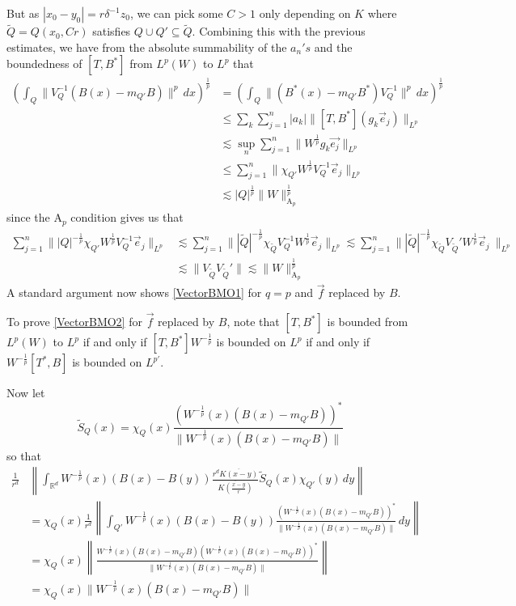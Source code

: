 \documentclass[12pt,reqno ]{amsart}
\numberwithin{equation}{section}
\theoremstyle{definition}
\newcommand{\Rd}{\ensuremath{\mathbb{R}^d}}
\newcommand{\V}[1]{\ensuremath{\vec{#1}}}
\newcommand{\inrd}{\ensuremath{\int_{\Rd}}}
\newcommand{\W}[1]{\ensuremath{\widetilde{#1}}}
\begin{document}
But as $|x_0 - y_0 | = r \delta^{-1} z_0$, we can pick some $C > 1$ only depending on $K$ where  $\tilde{Q} = Q(x_0, C r) $ satisfies $Q \cup Q' \subseteq \tilde{Q}$.  Combining this with the previous estimates, we have from the absolute summability of the $a_n's $ and the boundedness of $[T, B^*]$ from $L^p(W)$ to $L^p$ that \begin{align*} \left(\int_{Q} \|  V_Q ^{-1} (B(x) - m_{Q'} B ) \| ^p \, dx \right) ^{\frac{1}{p}} & = \left(\int_{Q} \|   (B^*(x) - m_{Q'} B^* ) V_Q ^{-1} \| ^p \, dx \right) ^{\frac{1}{p}} \\ & \leq \sum_k \sum_{j = 1}^n |a_k| \|  [T, B^*] (g_k \vec{e}_j)  \|_{L^p}  \\ & \lesssim   \sup_n  \sum_{j = 1}^n \| W^{\frac{1}{p}} g_k \vec{e_j} \|_{L^p } \\ & \leq \sum_{j = 1}^n \|\chi_{Q'}  W^{\frac{1}{p}} V_Q ^{-1} \vec{e}_j\|_{L^p} \\ & \lesssim   |Q|^\frac{1}{p} \|W\|_{\text{A}_p} ^\frac{1}{p} \end{align*} since the A${}_p$ condition gives us that \begin{align*}  \sum_{j = 1}^n \||Q|^{-\frac{1}{p}}\chi_{Q'}  W^{\frac{1}{p}} V_Q ^{-1} \V{e}_j \|_{L^p} & \lesssim   \sum_{j = 1}^n \||\tilde{Q}|^{-\frac{1}{p}} \chi_{\tilde{Q}} V_Q ^{-1} W^{\frac{1}{p}}  \V{e}_j \|_{L^p}  \lesssim  \sum_{j = 1}^n \| |\tilde{Q}|^{-\frac{1}{p}} \chi_{\tilde{Q}} V_{\tilde{Q}} '  W^{\frac{1}{p}}  \vec{e}_j \ \|_{L^p} \\ & \lesssim \|V_{\tilde{Q}}  V_{\tilde{Q}} ' \|  \lesssim \|W\|_{\text{A}_p} ^\frac{1}{p} \end{align*} A standard argument now shows \eqref{VectorBMO1} for $q = p$ and $\vec{f}$ replaced by $B$.

To prove \eqref{VectorBMO2} for $\vec{f}$ replaced by $B$, note that $[T, B^*]$ is bounded from $L^p(W)$ to $L^p$ if and only if $[T, B^*] W^{-\frac{1}{p}}$ is bounded on $L^p$ if and only if $W^{-\frac{1}{p}}[T^*, B]$ is bounded on $L^{p'}$.

Now let \begin{equation*} \W{S}_Q (x) = \chi_Q (x) \frac{(W^{-\frac{1}{p}} (x)  (B(x) - m_{Q'} B )  )^* }{\|W^{-\frac{1}{p}} (x)  (B(x) - m_{Q'} B )  \|}\end{equation*}  so that \begin{align}\frac{1}{r^d} &  \left\|\inrd  W^{-\frac{1}{p}} (x) (B(x) -B(y))  \frac{r^d \overline{K(x - y)}}{\overline{K(\frac{x-y}{r})}}  \W{S}_Q (x)  \chi_{Q'} (y) \, dy  \right\| \label{CommEst2} \\ & = \chi_Q (x)  \frac{1}{r^d} \left\| \int_{Q'}  W^{-\frac{1}{p}} (x) (B(x) -B(y))   \frac{(W^{-\frac{1}{p}} (x)  (B(x) - m_{Q'} B )  )^* }{\|W^{-\frac{1}{p}} (x)  (B(x) - m_{Q'} B )  \|}  \, dy \right\| \nonumber \\ & = \chi_Q (x) \left\|\frac{ W^{-\frac{1}{p}} (x)  (B(x) - m_{Q'} B ) (W^{-\frac{1}{p}} (x)  (B(x) - m_{Q'} B )   )^*}{\| W^{-\frac{1}{p}} (x)  (B(x) - m_{Q'} B ) \|} \right\| \nonumber \\ & = \chi_Q (x) \| W^{-\frac{1}{p}} (x)  (B(x) - m_{Q'} B ) \| \nonumber \end{align}
\end{document}
